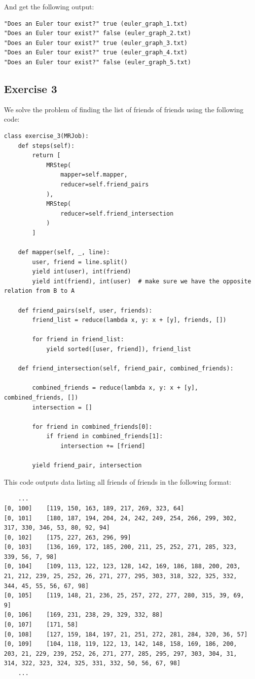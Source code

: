\documentclass{article}
\begin{document}
And get the following output:

\begin{lstlisting}
"Does an Euler tour exist?"	true (euler_graph_1.txt)
"Does an Euler tour exist?"	false (euler_graph_2.txt)
"Does an Euler tour exist?"	true (euler_graph_3.txt)
"Does an Euler tour exist?"	true (euler_graph_4.txt)
"Does an Euler tour exist?"	false (euler_graph_5.txt)
\end{lstlisting}

\subsection{Exercise 3}
\label{sub:Exercise 3}

We solve the problem of finding the list of friends of friends using the following code:

\begin{lstlisting}
class exercise_3(MRJob):
    def steps(self):
        return [
            MRStep(
                mapper=self.mapper,
                reducer=self.friend_pairs
            ),
            MRStep(
                reducer=self.friend_intersection
            )
        ]

    def mapper(self, _, line):
        user, friend = line.split()
        yield int(user), int(friend)
        yield int(friend), int(user)  # make sure we have the opposite relation from B to A

    def friend_pairs(self, user, friends):
        friend_list = reduce(lambda x, y: x + [y], friends, [])

        for friend in friend_list:
            yield sorted([user, friend]), friend_list

    def friend_intersection(self, friend_pair, combined_friends):

        combined_friends = reduce(lambda x, y: x + [y], combined_friends, [])
        intersection = []

        for friend in combined_friends[0]:
            if friend in combined_friends[1]:
                intersection += [friend]

        yield friend_pair, intersection
\end{lstlisting}

This code outputs data listing all friends of friends in the following format:

\begin{lstlisting}
	...
[0, 100]	[119, 150, 163, 189, 217, 269, 323, 64]
[0, 101]	[180, 187, 194, 204, 24, 242, 249, 254, 266, 299, 302, 317, 330, 346, 53, 80, 92, 94]
[0, 102]	[175, 227, 263, 296, 99]
[0, 103]	[136, 169, 172, 185, 200, 211, 25, 252, 271, 285, 323, 339, 56, 7, 98]
[0, 104]	[109, 113, 122, 123, 128, 142, 169, 186, 188, 200, 203, 21, 212, 239, 25, 252, 26, 271, 277, 295, 303, 318, 322, 325, 332, 344, 45, 55, 56, 67, 98]
[0, 105]	[119, 148, 21, 236, 25, 257, 272, 277, 280, 315, 39, 69, 9]
[0, 106]	[169, 231, 238, 29, 329, 332, 88]
[0, 107]	[171, 58]
[0, 108]	[127, 159, 184, 197, 21, 251, 272, 281, 284, 320, 36, 57]
[0, 109]	[104, 118, 119, 122, 13, 142, 148, 158, 169, 186, 200, 203, 21, 229, 239, 252, 26, 271, 277, 285, 295, 297, 303, 304, 31, 314, 322, 323, 324, 325, 331, 332, 50, 56, 67, 98]
	...
\end{lstlisting}
\end{document}
